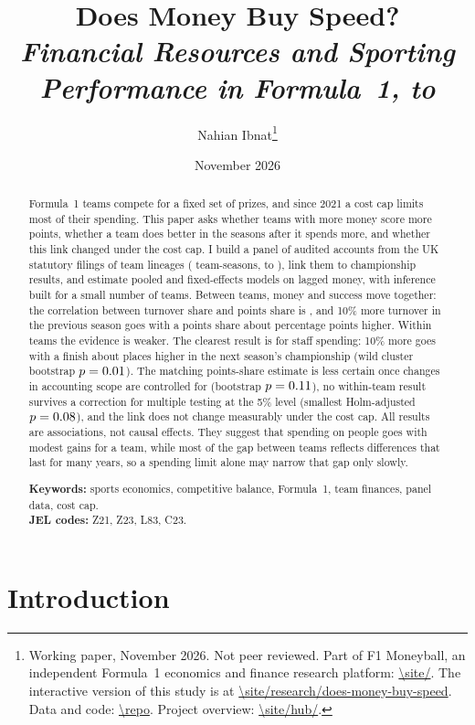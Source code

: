 \documentclass[11pt,a4paper]{article}
\title{\textbf{Does Money Buy Speed?}\\[0.3em]
  \large\textit{Financial Resources and Sporting Performance in Formula~1, \FirstSeason{} to \LastSeason}}
\author{Nahian Ibnat\thanks{Working paper, November 2026. Not peer reviewed. Part of F1 Moneyball, an independent
  Formula~1 economics and finance research platform: \url{\site/}. The interactive version of this study is at
  \url{\site/research/does-money-buy-speed}. Data and code: \url{\repo}. Project overview: \url{\site/hub/}.}}
\date{November 2026}
\begin{document}
\maketitle
\thispagestyle{plain}

\begin{abstract}
\noindent Formula~1 teams compete for a fixed set of prizes, and since 2021 a cost cap limits most of their spending. This
paper asks whether teams with more money score more points, whether a team does better in the seasons after it spends
more, and whether this link changed under the cost cap. I build a panel of audited accounts from the UK statutory filings of \NTeams{} team lineages (\NTeamSeasons{}
team-seasons, \FirstSeason{} to \LastSeason), link them to championship results, and estimate pooled and fixed-effects
models on lagged money, with inference built for a small number of teams. Between teams, money and success move together:
the correlation between turnover share and points share is \CorrAll, and 10\% more turnover in the previous season goes with
a points share about \PpTurnPooled{} percentage points higher. Within teams the evidence is weaker. The clearest result is
for staff spending: 10\% more goes with a finish about \PosTenStaffcosts{} places higher in the next season's championship
(wild cluster bootstrap $p = 0.01$). The matching points-share estimate is less certain once changes in
accounting scope are controlled for (bootstrap $p = 0.11$), no within-team result survives a correction for
multiple testing at the 5\% level (smallest Holm-adjusted $p = 0.08$), and the link does not change measurably
under the cost cap. All results are associations, not causal effects. They suggest that spending on people goes with
modest gains for a team, while most of the gap between teams reflects differences that last for many years, so a spending
limit alone may narrow that gap only slowly.

\medskip\noindent\textbf{Keywords:} sports economics, competitive balance, Formula~1, team finances, panel data, cost cap.\\
\textbf{JEL codes:} Z21, Z23, L83, C23.
\end{abstract}

\section{Introduction}
\label{sec:intro}
\end{document}
